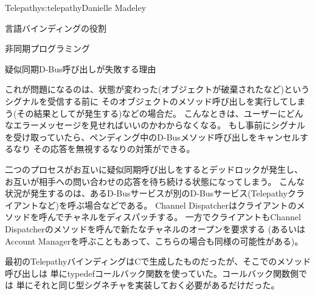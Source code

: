 \begin{aosachapter}{Telepathy}{s:telepathy}{Danielle Madeley}
\begin{aosasect1}{言語バインディングの役割}
\begin{aosasect2}{非同期プログラミング}
\begin{aosabox}{疑似同期D-Bus呼び出しが失敗する理由}
\begin{aosaitemize}
    これが問題になるのは、状態が変わった(オブジェクトが破棄されたなど)というシグナルを受信する前に
    そのオブジェクトのメソッド呼び出しを実行してしまう(その結果としてが発生する)などの場合だ。
    こんなときは、ユーザーにどんなエラーメッセージを見せればいいのかわからなくなる。
    もし事前にシグナルを受け取っていたら、ペンディング中のD-Busメソッド呼び出しをキャンセルするなり
    その応答を無視するなりの対策ができる。

  \item 二つのプロセスがお互いに疑似同期呼び出しをするとデッドロックが発生し、
  お互いが相手への問い合わせの応答を待ち続ける状態になってしまう。
  こんな状況が発生するのは、あるD-Busサービスが別のD-Busサービス(Telepathyクライアントなど)を呼ぶ場合などである。
  Channel Dispatcherはクライアントのメソッドを呼んでチャネルをディスパッチする。
  一方でクライアントもChannel Dispatcherのメソッドを呼んで新たなチャネルのオープンを要求する
  (あるいはAccount Managerを呼ぶこともあって、こちらの場合も同様の可能性がある)。

\end{aosaitemize}
\end{aosabox}

最初のTelepathyバインディングはCで生成したものだったが、そこでのメソッド呼び出しは
単にtypedefコールバック関数を使っていた。コールバック関数側では
単にそれと同じ型シグネチャを実装しておく必要があるだけだった。


\end{aosasect2}
\end{aosasect1}
\end{aosachapter}

